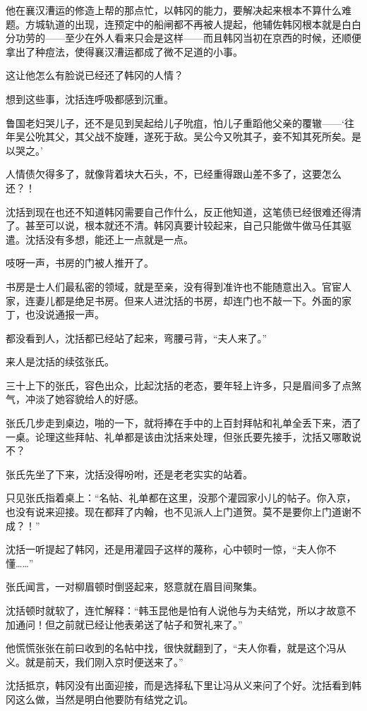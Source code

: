 他在襄汉漕运的修造上帮的那点忙，以韩冈的能力，要解决起来根本不算什么难题。方城轨道的出现，连预定中的船闸都不再被人提起，他辅佐韩冈根本就是白白分功劳的——至少在外人看来只会是这样——而且韩冈当初在京西的时候，还顺便拿出了种痘法，使得襄汉漕运都成了微不足道的小事。

这让他怎么有脸说已经还了韩冈的人情？

想到这些事，沈括连呼吸都感到沉重。

鲁国老妇哭儿子，还不是见到吴起给儿子吮疽，怕儿子重蹈他父亲的覆辙——‘往年吴公吮其父，其父战不旋踵，遂死于敌。吴公今又吮其子，妾不知其死所矣。是以哭之。’

人情债欠得多了，就像背着块大石头，不，已经重得跟山差不多了，这要怎么还？！

沈括到现在也还不知道韩冈需要自己作什么，反正他知道，这笔债已经很难还得清了。甚至可以说，根本就还不清。韩冈真要计较起来，自己只能做牛做马任其驱遣。沈括没有多想，能还上一点就是一点。

吱呀一声，书房的门被人推开了。

书房是士人们最私密的领域，就是至亲，没有得到准许也不能随意出入。官宦人家，连妻儿都是绝足书房。但来人进沈括的书房，却连门也不敲一下。外面的家丁，也没说通报一声。

都没看到人，沈括都已经站了起来，弯腰弓背，“夫人来了。”

来人是沈括的续弦张氏。

三十上下的张氏，容色出众，比起沈括的老态，要年轻上许多，只是眉间多了点煞气，冲淡了她容貌给人的好感。

张氏几步走到桌边，啪的一下，就将捧在手中的上百封拜帖和礼单全丢下来，洒了一桌。论理这些拜帖、礼单都是该由沈括来处理，但张氏要先接手，沈括又哪敢说不？

张氏先坐了下来，沈括没得吩咐，还是老老实实的站着。

只见张氏指着桌上：“名帖、礼单都在这里，没那个灌园家小儿的帖子。你入京，也没有说来迎接。现在都拜了内翰，也不见派人上门道贺。莫不是要你上门道谢不成？！”

沈括一听提起了韩冈，还是用灌园子这样的蔑称，心中顿时一惊，“夫人你不懂……”

张氏闻言，一对柳眉顿时倒竖起来，怒意就在眉目间聚集。

沈括顿时就软了，连忙解释：“韩玉昆他是怕有人说他与为夫结党，所以才故意不加通问！但之前就已经让他表弟送了帖子和贺礼来了。”

他慌慌张张在前曰收到的名帖中找，很快就翻到了，“夫人你看，就是这个冯从义。就是前天，我们刚入京时便送来了。”

沈括抵京，韩冈没有出面迎接，而是选择私下里让冯从义来问了个好。沈括看到韩冈这么做，当然是明白他要防有结党之讥。

